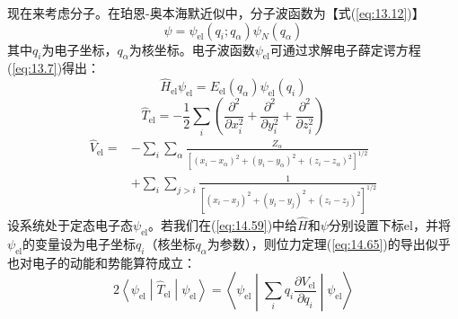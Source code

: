    现在来考虑分子。在珀恩-奥本海默近似中，分子波函数为【式(\ref{eq:13.12})】
    \begin{equation*}
        \psi = \psi_{\text{el}}\left(q_i;q_{\alpha}\right) \psi_N \left(q_{\alpha}\right)
    \end{equation*}
    其中$q_i$为电子坐标，$q_{\alpha}$为核坐标。电子波函数$\psi_{\text{el}}$可通过求解电子薛定谔方程(\ref{eq:13.7})得出：
    \begin{equation}
        \hat{H}_{\text{el}} \psi_{\text{el}} = E_{\text{el}} \left(q_{\alpha}\right) \psi_{\text{el}} \left(q_i\right)
        \label{eq:14.77}
    \end{equation}
    \begin{equation}
        \hat{T}_{\text{el}} = -\frac{1}{2} \sum_i \left(\frac{\partial ^2}{\partial x_i^2} + \frac{\partial ^2}{\partial y_i^2} + \frac{\partial ^2}{\partial z_i^2}\right)
        \label{eq:14.78}
    \end{equation}
    \begin{equation}
        \begin{aligned}
            \hat{V}_{\text{el}} = &-\sum_i \sum_{\alpha} \frac{Z_{\alpha}}{\left[\left(x_i - x_{\alpha}\right)^2 + \left(y_i - y_{\alpha}\right)^2 + \left(z_i - z_{\alpha}\right)^2\right]^{1/2}} \\
            &+ \sum_i \sum_{j>i} \frac{1}{\left[\left(x_i - x_j\right)^2 + \left(y_i - y_j\right)^2 + \left(z_i - z_j\right)^2\right]^{1/2}} 
        \end{aligned}
        \label{eq:14.79}
    \end{equation}
    设系统处于定态电子态$\psi_{\text{el}}$。若我们在(\ref{eq:14.59})中给$\hat{H}$和$\psi$分别设置下标el，并将$\psi_{\text{el}}$的变量设为电子坐标$q_i$（核坐标$q_{\alpha}$为参数），则位力定理(\ref{eq:14.65})的导出似乎也对电子的动能和势能算符成立：
    \begin{equation}
        2 \left\langle \psi_{\text{el}} \middle| \hat{T}_{\text{el}} \middle| \psi_{\text{el}} \right\rangle = \left\langle \psi_{\text{el}} \middle| \sum_i q_i \frac{\partial V_{\text{el}}}{\partial q_i} \middle| \psi_{\text{el}} \right\rangle
        \label{eq:14.80}
    \end{equation}


